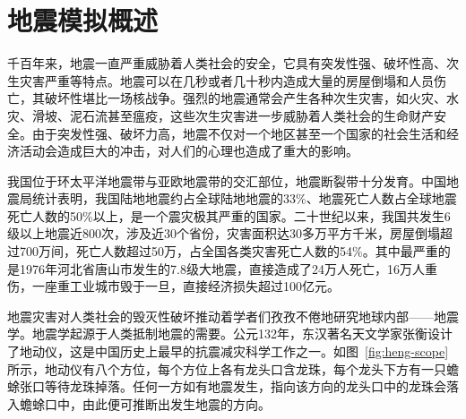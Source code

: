 
\section{地震模拟概述}



千百年来，地震一直严重威胁着人类社会的安全，它具有突发性强、破坏性高、次生灾害严重等特点。地震可以在几秒或者几十秒内造成大量的房屋倒塌和人员伤亡，其破坏性堪比一场核战争。强烈的地震通常会产生各种次生灾害，如火灾、水灾、滑坡、泥石流甚至瘟疫，这些次生灾害进一步威胁着人类社会的生命财产安全。由于突发性强、破坏力高，地震不仅对一个地区甚至一个国家的社会生活和经济活动会造成巨大的冲击，对人们的心理也造成了重大的影响。

我国位于环太平洋地震带与亚欧地震带的交汇部位，地震断裂带十分发育。中国地震局统计表明，我国陆地地震约占全球陆地地震的33\%、地震死亡人数占全球地震死亡人数的50\%以上，是一个震灾极其严重的国家\cite{地震局}。二十世纪以来，我国共发生6级以上地震近800次，涉及近30个省份，灾害面积达30多万平方千米，房屋倒塌超过700万间，死亡人数超过50万，占全国各类灾害死亡人数的54\%。其中最严重的是1976年河北省唐山市发生的7.8级大地震，直接造成了24万人死亡，16万人重伤，一座重工业城市毁于一旦，直接经济损失超过100亿元\cite{地震局}。

地震灾害对人类社会的毁灭性破坏推动着学者们孜孜不倦地研究地球内部——地震学。地震学起源于人类抵制地震的需要。公元132年，东汉著名天文学家张衡设计了地动仪，这是中国历史上最早的抗震减灾科学工作之一\citep{stein2009introduction}。如图~\ref{fig:heng-scope}所示，地动仪有八个方位，每个方位上各有龙头口含龙珠，每个龙头下方有一只蟾蜍张口等待龙珠掉落。任何一方如有地震发生，指向该方向的龙头口中的龙珠会落入蟾蜍口中，由此便可推断出发生地震的方向\cite{seismoscopewiki}。

